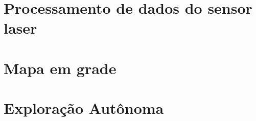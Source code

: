 \section{Processamento de dados do sensor laser}
\section{Mapa em grade}
\section{Exploração Autônoma}
